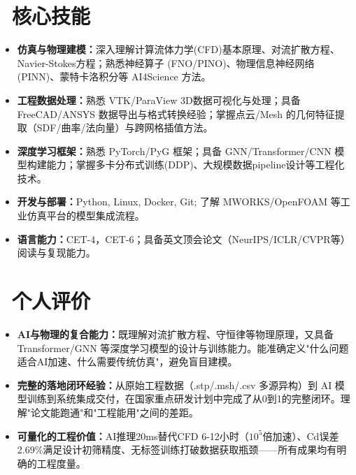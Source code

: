 \documentclass[11pt]{article}
\begin{document}
\section{\makebox[\widthof{\faCogs}][c]{\color{CVBlue}\faCogs}\ 核心技能}
    
\begin{itemize}
    \item \textbf{仿真与物理建模：}深入理解计算流体力学(CFD)基本原理、对流扩散方程、Navier-Stokes方程；熟悉神经算子 (FNO/PINO)、物理信息神经网络 (PINN)、蒙特卡洛积分等 AI4Science 方法。
    \item \textbf{工程数据处理：}熟悉 VTK/ParaView 3D数据可视化与处理；具备 FreeCAD/ANSYS 数据导出与格式转换经验；掌握点云/Mesh 的几何特征提取（SDF/曲率/法向量）与跨网格插值方法。
    \item \textbf{深度学习框架：}熟悉 PyTorch/PyG 框架；具备 GNN/Transformer/CNN 模型构建能力；掌握多卡分布式训练(DDP)、大规模数据pipeline设计等工程化技术。
    \item \textbf{开发与部署：}Python, Linux, Docker, Git; 了解 MWORKS/OpenFOAM 等工业仿真平台的模型集成流程。
    \item \textbf{语言能力：}CET-4，CET-6；具备英文顶会论文（NeurIPS/ICLR/CVPR等）阅读与复现能力。
\end{itemize}

\section{\makebox[\widthof{\faUser}][c]{\color{CVBlue}\faUser}\ 个人评价}

\begin{itemize}
    \item \textbf{AI与物理的复合能力：}既理解对流扩散方程、守恒律等物理原理，又具备 Transformer/GNN 等深度学习模型的设计与训练能力。能准确定义"什么问题适合AI加速、什么需要传统仿真"，避免盲目建模。
    \item \textbf{完整的落地闭环经验：}从原始工程数据（.stp/.msh/.csv 多源异构）到 AI 模型训练到系统集成交付，在国家重点研发计划中完成了从0到1的完整闭环。理解"论文能跑通"和"工程能用"之间的差距。
    \item \textbf{可量化的工程价值：}AI推理20ms替代CFD 6-12小时（$10^5$倍加速）、Cd误差2.69\%满足设计初筛精度、无标签训练打破数据获取瓶颈——所有成果均有明确的工程度量。
\end{itemize}
\end{document}
